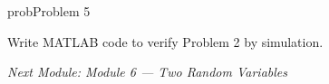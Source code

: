\begin{PSbox}[unbreakable]{prob}{Problem 5}

Write MATLAB code to verify Problem 2 by simulation.

\PSsolution{} 


\begin{Shaded}
\begin{Highlighting}[]
 \OperatorTok{=} \OperatorTok{;}  \OperatorTok{=} \OperatorTok{;}  \OperatorTok{=} \OperatorTok{;}
 \OperatorTok{=} \OperatorTok{*}\NormalTok{(}\OperatorTok{,}\NormalTok{)}\OperatorTok{;}
 \OperatorTok{=}  \OperatorTok{/} \OperatorTok{;}
\NormalTok{(}\OperatorTok{,} \OperatorTok{\^{}}\OperatorTok{/}\OperatorTok{,} \NormalTok{(}\NormalTok{))}\OperatorTok{;}
\NormalTok{(}\OperatorTok{,} \OperatorTok{{-}}\NormalTok{(}\OperatorTok{*}\OperatorTok{/}\OperatorTok{\^{}}\OperatorTok{,}\NormalTok{)}\OperatorTok{,} \NormalTok{(}\OperatorTok{\textgreater{}}\NormalTok{))}\OperatorTok{;}
\end{Highlighting}
\end{Shaded}

\emph{Next Module: {Module 6 — Two Random Variables}}

\end{PSbox}
